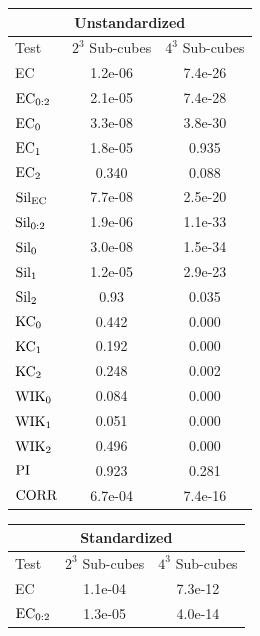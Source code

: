\documentclass[12pt]{article}
\begin{document}
\begin{table}[htp!]
    \begin{center}
        \begin{tabular}{ l | c | c }
          \toprule
          \multicolumn{3}{c}{Unstandardized} \\
          \toprule
          Test & $2^3$ Sub-cubes & $4^3$ Sub-cubes \\
          \midrule
          EC & 1.2e-06 & 7.4e-26 \\
          $\textup{EC}_{0:2}$ & 2.1e-05 & 7.4e-28 \\
          $\textup{EC}_{0}$ & 3.3e-08 & 3.8e-30 \\
          $\textup{EC}_{1}$ &  1.8e-05 & 0.935 \\
          $\textup{EC}_{2}$ & 0.340 & 0.088 \\
          \midrule
          $\textup{Sil}_{\textup{EC}}$ & 7.7e-08 & 2.5e-20 \\
          $\textup{Sil}_{0:2}$ & 1.9e-06 & 1.1e-33 \\
          $\textup{Sil}_{0}$ &3.0e-08 & 1.5e-34 \\
          $\textup{Sil}_{1}$ & 1.2e-05 & 2.9e-23 \\
          $\textup{Sil}_{2}$ & 0.93 & 0.035 \\
          \midrule
          $\textup{KC}_{0}$ & 0.442 & 0.000 \\
          $\textup{KC}_{1}$ & 0.192 & 0.000 \\
          $\textup{KC}_{2}$ & 0.248 & 0.002 \\
          \midrule
          $\textup{WIK}_{0}$ & 0.084 & 0.000 \\
          $\textup{WIK}_{1}$ & 0.051 & 0.000 \\
          $\textup{WIK}_{2}$ & 0.496 & 0.000 \\
          $\textup{PI}$ & 0.923 & 0.281 \\
          \midrule
          $\textup{CORR}$ & 6.7e-04 & 7.4e-16 \\
          \bottomrule
        \end{tabular}
        \begin{tabular}{ l | c |  c }
          \toprule
          \multicolumn{3}{c}{Standardized} \\
          \toprule
          Test & $2^3$ Sub-cubes& $4^3$ Sub-cubes \\
          \midrule
          EC & 1.1e-04 &  7.3e-12 \\
          $\textup{EC}_{0:2}$ & 1.3e-05 &  4.0e-14 \\

\end{tabular}
\end{center}
\end{table}
\end{document}

